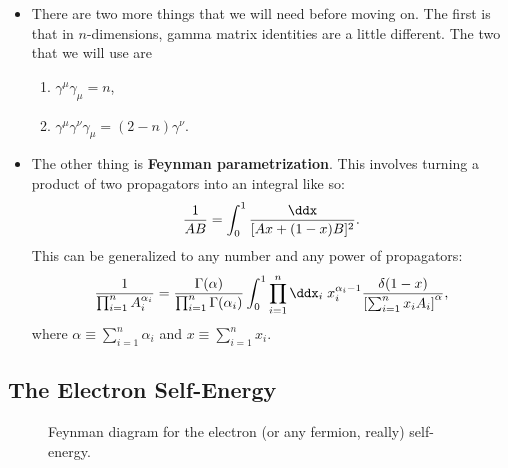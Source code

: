 \begin{itemize}
\begin{equation}
        \end{equation}
    \item There are two more things that we will need before moving on. The first is that in $n$-dimensions, gamma matrix identities are a little different. The two that we will use are 
        \begin{enumerate}
            \item $\gamma^{\mu}\gamma_{\mu} = n$,
            \item $\gamma^{\mu}\gamma^{\nu}\gamma_{\mu} = (2-n)\gamma^{\nu}$.
        \end{enumerate}
    \item The other thing is \textbf{Feynman parametrization}. This involves turning a product of two propagators into an integral like so:
        \begin{equation}
            \frac{1}{AB} = \int_0^1 \frac{\ddx}{[Ax + (1-x)B]^2}.
        \end{equation}
        This can be generalized to any number and any power of propagators:
        \begin{equation}
            \frac{1}{\prod_{i=1}^{n}A_i^{\alpha_i}} = \frac{\Gamma(\alpha)}{\prod_{i=1}^{n} \Gamma(\alpha_i)} \int_0^1 \prod_{i=1}^{n} \ddx_i \; x_i^{\alpha_i - 1} \frac{\delta(1-x)}{\left[ \sum_{i=1}^{n} x_iA_i \right]^{\alpha}},
        \end{equation}
        where $\alpha \equiv \sum_{i=1}^{n} \alpha_i$ and $x \equiv \sum_{i=1}^{n} x_i$.
\end{itemize}



\subsection*{The Electron Self-Energy}


\begin{figure}[ht]
    \centering
    

    \caption{Feynman diagram for the electron (or any fermion, really) self-energy.}
    \label{fig:ElectronSelfEnergyDiagram}
\end{figure}


